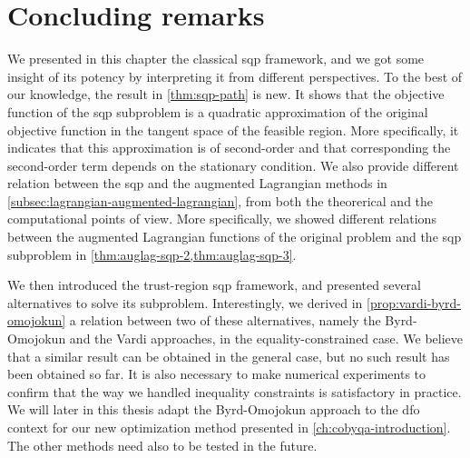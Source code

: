 \section{Concluding remarks}

We presented in this chapter the classical \gls{sqp} framework, and we got some insight of its potency by interpreting it from different perspectives.
To the best of our knowledge, the result in \cref{thm:sqp-path} is new.
It shows that the objective function of the \gls{sqp} subproblem is a quadratic approximation of the original objective function in the tangent space of the feasible region.
More specifically, it indicates that this approximation is of second-order and that corresponding the second-order term depends on the stationary condition.
We also provide different relation between the \gls{sqp} and the augmented Lagrangian methods in \cref{subsec:lagrangian-augmented-lagrangian}, from both the theorerical and the computational points of view.
More specifically, we showed different relations between the augmented Lagrangian functions of the original problem and the \gls{sqp} subproblem in \cref{thm:auglag-sqp-2,thm:auglag-sqp-3}.

We then introduced the trust-region \gls{sqp} framework, and presented several alternatives to solve its subproblem.
Interestingly, we derived in \cref{prop:vardi-byrd-omojokun} a relation between two of  these alternatives, namely the Byrd-Omojokun and the Vardi approaches, in the equality-constrained case.
We believe that a similar result can be obtained in the general case, but no such result has been obtained so far.
It is also necessary to make numerical experiments to confirm that the way we handled inequality constraints is satisfactory in practice.
We will later in this thesis adapt the Byrd-Omojokun approach to the \gls{dfo} context for our new optimization method presented in \cref{ch:cobyqa-introduction}.
The other methods need also to be tested in the future.
